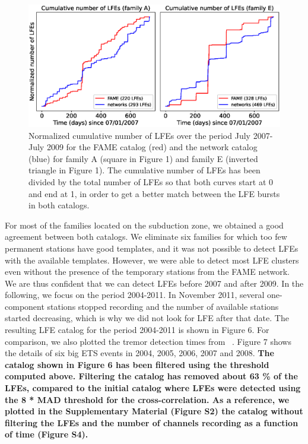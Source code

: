 \documentclass[draft]{agujournal2019}
\begin{document}
\begin{figure}
\noindent\includegraphics[width=\textwidth, trim={0cm 0cm 0cm 0cm},clip]{figures/cumulative.eps}
\caption{Normalized cumulative number of LFEs over the period July 2007-July 2009 for the FAME catalog (red) and the network catalog (blue) for family A (square in Figure 1) and family E (inverted triangle in Figure 1). The cumulative number of LFEs has been divided by the total number of LFEs so that both curves start at 0 and end at 1, in order to get a better match between the LFE bursts in both catalogs.}
\label{pngfiguresample}
\end{figure}

For most of the families located on the subduction zone, we obtained a good agreement between both catalogs. We eliminate six families for which too few permanent stations have good templates, and it was not possible to detect LFEs with the available templates. However, we were able to detect most LFE clusters even without the presence of the temporary stations from the FAME network. We are thus confident that we can detect LFEs before 2007 and after 2009. In the following, we focus on the period 2004-2011. In November 2011, several one-component stations stopped recording and the number of available stations started decreasing, which is why we did not look for LFE after that date. The resulting LFE catalog for the period 2004-2011 is shown in Figure 6. For comparison, we also plotted the tremor detection times from ~. Figure 7 shows the details of six big ETS events in 2004, 2005, 2006, 2007 and 2008. \textbf{The catalog shown in Figure 6 has been filtered using the threshold computed above. Filtering the catalog has removed about 63 \% of the LFEs, compared to the initial catalog where LFEs were detected using the 8 * MAD threshold for the cross-correlation. As a reference, we plotted in the Supplementary Material (Figure S2) the catalog without filtering the LFEs and the number of channels recording as a function of time (Figure S4).} \\
\end{document}
